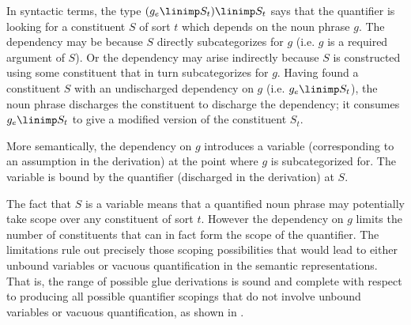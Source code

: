 In syntactic terms, the type
$(g_e\linimp S_t)\linimp S_t$ says that the quantifier is looking for
a constituent $S$ of sort $t$ which depends on the  
noun phrase $g$.  The dependency may be because $S$ directly 
subcategorizes for
$g$ (i.e. $g$ is a required argument of $S$).  Or the dependency may 
arise indirectly because $S$ is constructed using some constituent that 
in turn subcategorizes for $g$.  Having found a constituent $S$ with
an undischarged dependency on
$g$ (i.e. $g_e\linimp S_t$), the noun phrase discharges the constituent
to discharge the dependency; it consumes $g_e\linimp S_t$ to give a
modified version of the constituent $S_t$.

More semantically, the dependency on $g$ introduces a variable (corresponding
to an assumption in the derivation) at the point where $g$ is subcategorized
for.  The variable is bound by the quantifier (discharged in the derivation)
at $S$.

The fact that $S$ is a variable means that a quantified noun phrase may 
potentially take scope over any constituent of sort $t$.  However the
dependency on $g$ limits the number of constituents that can in fact 
form the scope of the quantifier.  The limitations rule out precisely
those scoping possibilities that would lead to either unbound variables or
vacuous quantification in the semantic representations.  That is, the
range of possible glue derivations is sound and complete with respect
to producing all possible quantifier scopings that do not involve
unbound variables or vacuous quantification, as shown in .

